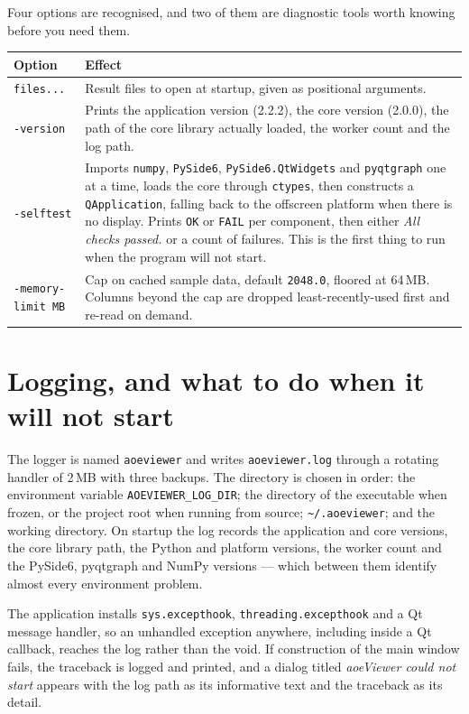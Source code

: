 \documentclass[11pt,a4paper,oneside]{report}
\newcommand{\appver}{2.2.2}
\newcommand{\code}[1]{\texttt{#1}}
\begin{document}
Four options are recognised, and two of them are diagnostic tools worth knowing
before you need them.

\begin{center}
\small
\begin{tabular}{@{}p{}p{}@{}}
\toprule
\textbf{Option} & \textbf{Effect} \\
\midrule
\code{files...} & Result files to open at startup, given as positional arguments. \\
\addlinespace
\code{-version} & Prints the application version (\appver), the core version
  (2.0.0), the path of the core library actually loaded, the worker count and
  the log path. \\
\addlinespace
\code{-selftest} & Imports \code{numpy}, \code{PySide6},
  \code{PySide6.QtWidgets} and \code{pyqtgraph} one at a time, loads the core
  through \code{ctypes}, then constructs a \code{QApplication}, falling back to
  the offscreen platform when there is no display. Prints \code{OK} or
  \code{FAIL} per component, then either \emph{All checks passed.} or a count of
  failures. This is the first thing to run when the program will not start. \\
\addlinespace
\code{-memory-limit MB} & Cap on cached sample data, default \code{2048.0},
  floored at 64\,MB. Columns beyond the cap are dropped least-recently-used
  first and re-read on demand. \\
\bottomrule
\end{tabular}
\end{center}

\section{Logging, and what to do when it will not start}

The logger is named \code{aoeviewer} and writes \code{aoeviewer.log} through a
rotating handler of 2\,MB with three backups. The directory is chosen in order:
the environment variable \code{AOEVIEWER\_LOG\_DIR}; the directory of the
executable when frozen, or the project root when running from source;
\code{\textasciitilde/.aoeviewer}; and the working directory. On startup the log
records the application and core versions, the core library path, the Python and
platform versions, the worker count and the PySide6, pyqtgraph and NumPy
versions --- which between them identify almost every environment problem.

The application installs \code{sys.excepthook},
\code{threading.excepthook} and a Qt message handler, so an unhandled exception
anywhere, including inside a Qt callback, reaches the log rather than the void.
If construction of the main window fails, the traceback is logged and printed,
and a dialog titled \emph{aoeViewer could not start} appears with the log path as
its informative text and the traceback as its detail.
\end{document}
